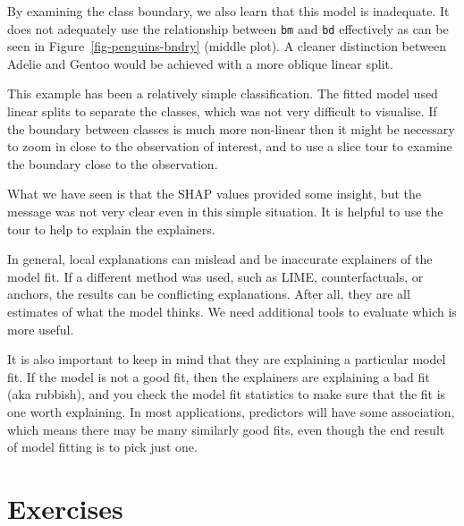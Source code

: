 \documentclass[
  letterpaper,
]{krantz}
\begin{document}
By examining the class boundary, we also learn that this model is
inadequate. It does not adequately use the relationship between
\texttt{bm} and \texttt{bd} effectively as can be seen in
Figure~\ref{fig-penguins-bndry} (middle plot). A cleaner distinction
between Adelie and Gentoo would be achieved with a more oblique linear
split.

This example has been a relatively simple classification. The fitted
model used linear splits to separate the classes, which was not very
difficult to visualise. If the boundary between classes is much more
non-linear then it might be necessary to zoom in close to the
observation of interest, and to use a slice tour to examine the boundary
close to the observation.

What we have seen is that the SHAP values provided some insight, but the
message was not very clear even in this simple situation. It is helpful
to use the tour to help to explain the explainers.

In general, local explanations can mislead and be inaccurate explainers
of the model fit. If a different method was used, such as LIME,
counterfactuals, or anchors, the results can be conflicting
explanations. After all, they are all estimates of what the model
thinks. We need additional tools to evaluate which is more useful.

It is also important to keep in mind that they are explaining a
particular model fit. If the model is not a good fit, then the
explainers are explaining a bad fit (aka rubbish), and you check the
model fit statistics to make sure that the fit is one worth explaining.
In most applications, predictors will have some association, which means
there may be many similarly good fits, even though the end result of
model fitting is to pick just one.

\section*{Exercises}\label{exercises-17}


 
\end{document}
